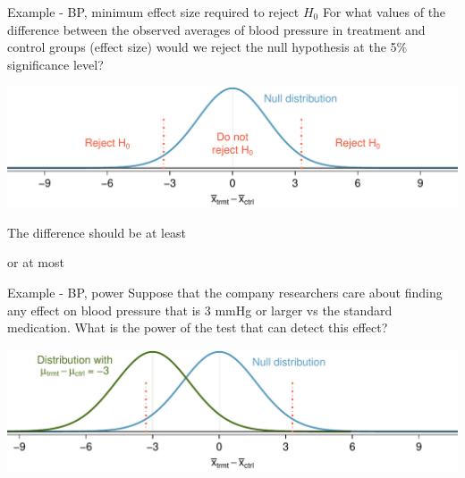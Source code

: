 \documentclass[
  ignorenonframetext,
]{beamer}
\begin{document}
\begin{frame}{Example - BP, minimum effect size required to reject
\(H_0\)}
\protect\hypertarget{example---bp-minimum-effect-size-required-to-reject-h_0}{}
\alert{For what values of the difference between the observed averages of blood pressure in treatment and control groups (effect size) would we reject the null hypothesis at the 5\% significance level?}

\pause

\includegraphics[width=\textwidth,height=0.5\textheight]{power_null_B_0_1-7_with_rejection_region.pdf}

\pause

The difference should be at least


\raggedright or at most

\end{frame}

\begin{frame}{Example - BP, power}
\protect\hypertarget{example---bp-power}{}
\alert{Suppose that the company researchers care about finding any effect on blood pressure that is 3 mmHg or larger vs the standard medication. What is the power of the test that can detect this effect?}

\pause

\includegraphics[width=\textwidth,height=0.5\textheight]{power_null_C_0_1-7_with_alt_at_3.pdf}

\pause


\pause

\end{frame}
\end{document}
